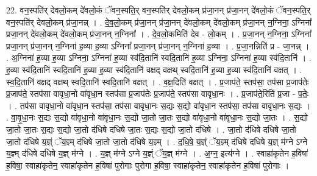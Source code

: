 \documentclass[17pt]{extarticle}
\begin{document}
22. वन॒स्पति॑र् देवलो॒कम् दे॑वलो॒कं ॅवन॒स्पति॒र् वन॒स्पति॑र् देवलो॒कम् प्र॑जा॒नन् प्र॑जा॒नन् दे॑वलो॒कं ॅवन॒स्पति॒र् वन॒स्पति॑र् देवलो॒कम् प्र॑जा॒नन्न् । . दे॒व॒लो॒कम् प्र॑जा॒नन् प्र॑जा॒नन् दे॑वलो॒कम् दे॑वलो॒कम् प्र॑जा॒नन् न॒ग्निना॒ ऽग्निना᳚ प्रजा॒नन् दे॑वलो॒कम् दे॑वलो॒कम् प्र॑जा॒नन् न॒ग्निना᳚ । . दे॒व॒लो॒कमिति॑ देव - लो॒कम् । . प्र॒जा॒नन् न॒ग्निना॒ ऽग्निना᳚ प्रजा॒नन् प्र॑जा॒नन् न॒ग्निना॑ ह॒व्या ह॒व्या ऽग्निना᳚ प्रजा॒नन् प्र॑जा॒नन् न॒ग्निना॑ ह॒व्या । . प्र॒जा॒नन्निति॑ प्र - जा॒नन्न् । . अ॒ग्निना॑ ह॒व्या ह॒व्या ऽग्निना॒ ऽग्निना॑ ह॒व्या स्व॑दि॒तानि॑ स्वदि॒तानि॑ ह॒व्या ऽग्निना॒ ऽग्निना॑ ह॒व्या स्व॑दि॒तानि॑ । . ह॒व्या स्व॑दि॒तानि॑ स्वदि॒तानि॑ ह॒व्या ह॒व्या स्व॑दि॒तानि॑ वक्षद् वक्षथ् स्वदि॒तानि॑ ह॒व्या ह॒व्या स्व॑दि॒तानि॑ वक्षत् । . स्व॒दि॒तानि॑ वक्षद् वक्षथ् स्वदि॒तानि॑ स्वदि॒तानि॑ वक्षत् । . व॒क्ष॒दिति॑ वक्षत् । . प्र॒जाप॑ते॒ स्तप॑सा॒ तप॑सा प्र॒जाप॑तेः प्र॒जाप॑ते॒ स्तप॑सा वावृधा॒नो वा॑वृधा॒न स्तप॑सा प्र॒जाप॑तेः प्र॒जाप॑ते॒ स्तप॑सा वावृधा॒नः । . प्र॒जाप॑ते॒रिति॑ प्र॒जा - प॒तेः॒ । . तप॑सा वावृधा॒नो वा॑वृधा॒न स्तप॑सा॒ तप॑सा वावृधा॒नः स॒द्यः स॒द्यो वा॑वृधा॒न स्तप॑सा॒ तप॑सा वावृधा॒नः स॒द्यः । . वा॒वृ॒धा॒नः स॒द्यः स॒द्यो वा॑वृधा॒नो वा॑वृधा॒नः स॒द्यो जा॒तो जा॒तः स॒द्यो वा॑वृधा॒नो वा॑वृधा॒नः स॒द्यो जा॒तः । . स॒द्यो जा॒तो जा॒तः स॒द्यः स॒द्यो जा॒तो द॑धिषे दधिषे जा॒तः स॒द्यः स॒द्यो जा॒तो द॑धिषे । . जा॒तो द॑धिषे दधिषे जा॒तो जा॒तो द॑धिषे य॒ज्ञ्ं ॅय॒ज्ञ्म् द॑धिषे जा॒तो जा॒तो द॑धिषे य॒ज्ञ्म् । . द॒धि॒षे॒ य॒ज्ञ्ं ॅय॒ज्ञ्म् द॑धिषे दधिषे य॒ज्ञ् म॑ग्ने ऽग्ने य॒ज्ञ्म् द॑धिषे दधिषे य॒ज्ञ् म॑ग्ने । . य॒ज्ञ् म॑ग्ने ऽग्ने य॒ज्ञ्ं ॅय॒ज्ञ् म॑ग्ने । . अ॒ग्न॒ इत्य॑ग्ने । . स्वाहा॑कृतेन ह॒विषा॑ ह॒विषा॒ स्वाहा॑कृतेन॒ स्वाहा॑कृतेन ह॒विषा॑ पुरोगाः पुरोगा ह॒विषा॒ स्वाहा॑कृतेन॒ स्वाहा॑कृतेन ह॒विषा॑ पुरोगाः । \newline
\end{document}

